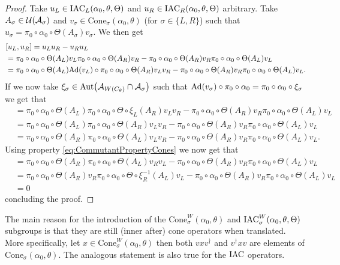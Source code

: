 \documentclass[11pt,a4paper,twoside]{article}
\numberwithin{equation}{section}
\begin{document}
\begin{proof}
	Take $u_L\in\textrm{IAC}_L(\alpha_0,\theta,\Theta)$ and $u_R\in\textrm{IAC}_R(\alpha_0,\theta,\Theta)$ arbitrary. Take $A_\sigma\in\mathcal U(\mathcal A_\sigma)$ and $v_\sigma\in\textrm{Cone}_\sigma(\alpha_0,\theta)$ (for $\sigma\in\{L,R\}$) such that $u_\sigma=\pi_0\circ\alpha_0\circ\Theta(A_\sigma)v_\sigma$. We then get
	\begin{align}
		&[u_L,u_R]=u_Lu_R-u_Ru_L\\
		&=\pi_0\circ\alpha_0\circ\Theta(A_L)v_L\pi_0\circ\alpha_0\circ\Theta(A_R)v_R-\pi_0\circ\alpha_0\circ\Theta(A_R)v_R\pi_0\circ\alpha_0\circ\Theta(A_L)v_L\\
		&=\pi_0\circ\alpha_0\circ\Theta(A_L)\Ad{v_L}\circ\pi_0\circ\alpha_0\circ\Theta(A_R)v_Lv_R-\pi_0\circ\alpha_0\circ\Theta(A_R)v_R\pi_0\circ\alpha_0\circ\Theta(A_L)v_L.
	\end{align}
	If we now take $\xi_\sigma\in\Aut{\AA_{W(C_\theta)}\cap\AA_\sigma}$ such that $\Ad{v_\sigma}\circ\pi_0\circ\alpha_0=\pi_0\circ\alpha_0\circ\xi_\sigma$ we get that
	\begin{align}
		&=\pi_0\circ\alpha_0\circ\Theta(A_L)\pi_0\circ\alpha_0\circ\Theta\circ\xi_L(A_R)v_Lv_R-\pi_0\circ\alpha_0\circ\Theta(A_R)v_R\pi_0\circ\alpha_0\circ\Theta(A_L)v_L\\
		&=\pi_0\circ\alpha_0\circ\Theta(A_L)\pi_0\circ\alpha_0\circ\Theta(A_R)v_Lv_R-\pi_0\circ\alpha_0\circ\Theta(A_R)v_R\pi_0\circ\alpha_0\circ\Theta(A_L)v_L\\
		&=\pi_0\circ\alpha_0\circ\Theta(A_R)\pi_0\circ\alpha_0\circ\Theta(A_L)v_Lv_R-\pi_0\circ\alpha_0\circ\Theta(A_R)v_R\pi_0\circ\alpha_0\circ\Theta(A_L)v_L.
	\end{align}
	Using property \eqref{eq:CommutantPropertyCones} we now get that
	\begin{align}
		&=\pi_0\circ\alpha_0\circ\Theta(A_R)\pi_0\circ\alpha_0\circ\Theta(A_L)v_Rv_L-\pi_0\circ\alpha_0\circ\Theta(A_R)v_R\pi_0\circ\alpha_0\circ\Theta(A_L)v_L\\
		&=\pi_0\circ\alpha_0\circ\Theta(A_R)v_R\pi_0\circ\alpha_0\circ\Theta\circ\xi_R^{-1}(A_L)v_L-\pi_0\circ\alpha_0\circ\Theta(A_R)v_R\pi_0\circ\alpha_0\circ\Theta(A_L)v_L\\
		&=0
	\end{align}
	concluding the proof.
\end{proof}
\begin{remark}
	The main reason for the introduction of the $\textrm{Cone}_\sigma^W(\alpha_0,\theta)$ and $\textrm{IAC}^W_\sigma(\alpha_0,\theta,\Theta)$ subgroups is that they are still (inner after) cone operators when translated. More specifically, let $x\in\textrm{Cone}_\sigma^W(\alpha_0,\theta)$ then both $vxv^\dagger$ and $v^\dagger x v$ are elements of $\textrm{Cone}_\sigma(\alpha_0,\theta)$. The analogous statement is also true for the $\textrm{IAC}$ operators.
\end{remark}
\end{document}
